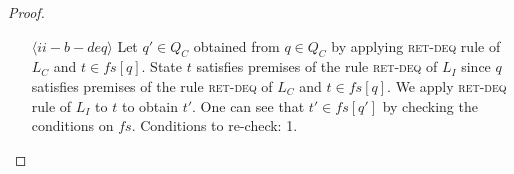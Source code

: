 \begin{proof}
\begin{itemize}
\item[$\langle ii-b-deq \rangle$] Let $q' \in Q_C$ obtained from $q \in Q_C$ by applying \textsc{ret-deq} rule of $L_C$ and $t \in fs[q]$. State $t$ satisfies premises of the rule \textsc{ret-deq} of $L_I$ since $q$ satisfies premises of the rule \textsc{ret-deq} of $L_C$ and $t \in fs[q]$. We apply \textsc{ret-deq} rule of $L_I$ to $t$ to obtain $t'$.  One can see that $t' \in fs[q']$ by checking the conditions on $fs$. Conditions to re-check: 1.
\end{itemize}
\end{proof}